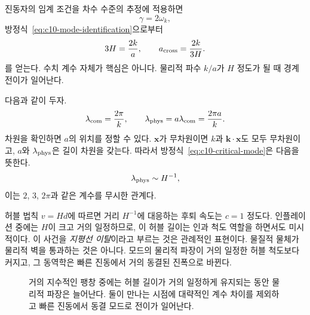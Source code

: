 진동자의 임계 조건을 차수 수준의 추정에 적용하면
\[
\gamma=2\omega_k,
\]
방정식~\eqref{eq:c10-mode-identification}으로부터
\begin{equation}
3H=\frac{2k}{a},
\qquad
a_{\rm cross}=\frac{2k}{3H}.
\label{eq:c10-critical-mode}
\end{equation}
를 얻는다. 수치 계수 자체가 핵심은 아니다. 물리적 파수 \(k/a\)가 \(H\) 정도가 될 때 경계 전이가 일어난다.

다음과 같이 두자.
\[
\lambda_{\rm com}=\frac{2\pi}{k},
\qquad
\lambda_{\rm phys}=a\lambda_{\rm com}
=\frac{2\pi a}{k}.
\]
차원을 확인하면 \(a\)의 위치를 정할 수 있다. \(\mathbf x\)가 무차원이면 \(k\)과 \(\mathbf k\cdot\mathbf x\)도 모두 무차원이고, \(a\)와 \(\lambda_{\rm phys}\)은 길이 차원을 갖는다. 따라서 방정식~\eqref{eq:c10-critical-mode}은 다음을 뜻한다.
\begin{equation}
\lambda_{\rm phys}\sim H^{-1},
\label{eq:c10-horizon-crossing}
\end{equation}
이는 \(2\), \(3\), \(2\pi\)과 같은 계수를 무시한 관계다.

허블 법칙 \(v=Hd\)에 따르면 거리 \(H^{-1}\)에 대응하는 후퇴 속도는 \(c=1\) 정도다. 인플레이션 중에는 \(H\)이 크고 거의 일정하므로, 이 허블 길이는 인과 척도 역할을 하면서도 미시적이다. 이 사건을 \emph{지평선 이탈}이라고 부르는 것은 관례적인 표현이다. 물질적 물체가 물리적 벽을 통과하는 것은 아니다. 모드의 물리적 파장이 거의 일정한 허블 척도보다 커지고, 그 동역학은 빠른 진동에서 거의 동결된 진폭으로 바뀐다.

\begin{figure}[htbp]\centering
\begin{coursefitfigure}\end{coursefitfigure}\caption{거의 지수적인 팽창 중에는 허블 길이가 거의 일정하게 유지되는 동안 물리적 파장은 늘어난다. 둘이 만나는 시점에 대략적인 계수 차이를 제외하고 빠른 진동에서 동결 모드로 전이가 일어난다.}\label{fig:c10-horizon-reconstruction}\end{figure}

